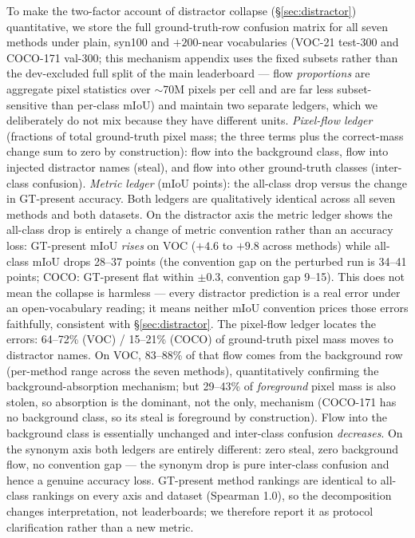 \documentclass[11pt]{article}
\newcommand{\miou}{mIoU}
\begin{document}
To make the two-factor account of distractor collapse
(\S\ref{sec:distractor}) quantitative, we store the full ground-truth-row
confusion matrix for all seven methods under plain, syn100 and $+200$-near
vocabularies (VOC-21 test-300 and COCO-171 val-300; this mechanism appendix
uses the fixed subsets rather than the dev-excluded full split of the main
leaderboard --- flow \emph{proportions} are aggregate pixel statistics over
$\sim$70M pixels per cell and are far less subset-sensitive than per-class
\miou{}) and maintain two separate ledgers, which we deliberately do not mix
because they have different units. \emph{Pixel-flow ledger} (fractions of
total ground-truth pixel mass; the three terms plus the correct-mass change
sum to zero by construction): flow into the background class, flow into
injected distractor names (steal), and flow into other ground-truth classes
(inter-class confusion). \emph{Metric ledger} (\miou{} points): the all-class
drop versus the change in GT-present accuracy. Both ledgers are
qualitatively identical across all seven methods and both datasets. On the
distractor axis the metric ledger shows the all-class drop is entirely a
change of metric convention rather than an accuracy loss: GT-present \miou{}
\emph{rises} on VOC ($+4.6$ to $+9.8$ across methods) while all-class \miou{}
drops 28--37 points (the convention gap on the perturbed run is 34--41
points; COCO: GT-present flat within $\pm 0.3$, convention gap 9--15). This
does not mean the collapse is harmless --- every distractor prediction is a
real error under an open-vocabulary reading; it means neither \miou{}
convention prices those errors faithfully, consistent with
\S\ref{sec:distractor}. The pixel-flow ledger locates the errors: 64--72\%
(VOC) / 15--21\% (COCO) of ground-truth pixel mass moves to distractor
names. On VOC, 83--88\% of that flow comes from the background row
(per-method range across the seven methods), quantitatively confirming the
background-absorption mechanism; but 29--43\% of \emph{foreground} pixel mass
is also stolen, so absorption is the dominant, not the only, mechanism
(COCO-171 has no background class, so its steal is foreground by
construction). Flow into the background class is essentially unchanged and
inter-class confusion \emph{decreases}. On the synonym axis both ledgers are
entirely different: zero steal, zero background flow, no convention gap ---
the synonym drop is pure inter-class confusion and hence a genuine accuracy
loss. GT-present method rankings are identical to all-class rankings on
every axis and dataset (Spearman 1.0), so the decomposition changes
interpretation, not leaderboards; we therefore report it as protocol
clarification rather than a new metric.
\end{document}
